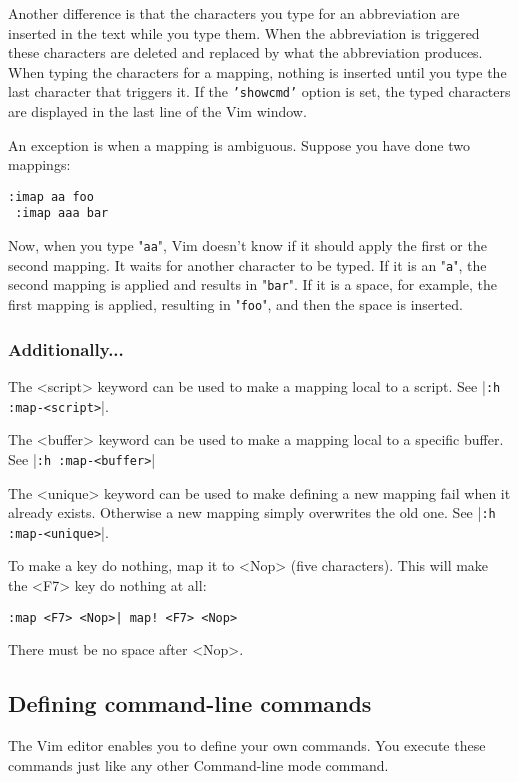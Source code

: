 {{Another difference is that the characters you type for an abbreviation are inserted in the text while you type them.
When the abbreviation is triggered these characters are deleted and replaced by what the abbreviation produces.
When typing the characters for a mapping, nothing is inserted until you type the last character that triggers it.
If the \texttt{'showcmd'} option is set, the typed characters are displayed in the last line of the Vim window.

An exception is when a mapping is ambiguous.
Suppose you have done two mappings:

\begin{Verbatim}[samepage=true]
 :imap aa foo
 :imap aaa bar
\end{Verbatim}

Now, when you type "\texttt{aa}", Vim doesn't know if it should apply the first or the second mapping.
It waits for another character to be typed.
If it is an "\texttt{a}", the second mapping is applied and results in "\texttt{bar}".
If it is a space, for example, the first mapping is applied, resulting in "\texttt{foo}", and then the space is inserted.

\subsubsection{Additionally...}
The <script> keyword can be used to make a mapping local to a script.
See |\texttt{:h :map-<script>}|.

The <buffer> keyword can be used to make a mapping local to a specific buffer.
See |\texttt{:h :map-<buffer>}|

The <unique> keyword can be used to make defining a new mapping fail when it already exists.
Otherwise a new mapping simply overwrites the old one.
See |\texttt{:h :map-<unique>}|.

To make a key do nothing, map it to <Nop> (five characters).
This will make the <F7> key do nothing at all:

\begin{Verbatim}[samepage=true]
 :map <F7> <Nop>| map! <F7> <Nop>
\end{Verbatim}

There must be no space after <Nop>.
\subsection{Defining command-line commands}
The Vim editor enables you to define your own commands.
You execute these commands just like any other Command-line mode command.

}}
